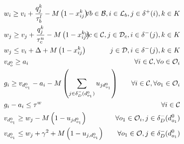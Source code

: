 \begin{alignat}{3}
    \label{mod:c5}         & w_{i} \geq v_{i}  + \frac{q^k_j}{\tau^l_b} -M\left(1- x^{k}_{ij}\right)                                                                                                                                                                                                                          & \hspace{-20mm} \forall  b \in \mathcal{B},  i \in \mathcal{L}_{b},  j \in \delta^{+}(i), k \in K \\
    \label{mod:c6}         & w_{j} \geq v_{j}  + {  \frac{q^k_j}{\tau^u_c} -M\left(1- x^{k}_{ij}\right) }                                                                                                                                                                                                                     & \hspace{-20mm}  \forall c \in  \mathcal{C}, j \in \mathcal{D}_{c}, i \in \delta^{-}(j),  k \in K \\
    \label{mod:c7}         & w_{j} \leq v_{i}  + \Delta + M\left(1- x^{k}_{ij}\right)                                                                                                                                                                                                                                         & \hspace{-20mm}   j \in \mathcal{D},  i \in \delta^{-}(j),  k \in K                               \\
    \label{mod:c8}         & v_{d^0_{o}} \geq a_i    & \hspace{-20mm} \forall  i \in \mathcal{C}, \forall o \in \mathcal{O}_i                           \\
    \label{mod:c9}  & g_{i} \geq v_{d^0_{o_1}} - a_i - M\left(  \sum_{ j \in \delta^{-}_{D}(d^0_{o_1})  }{u_{jd^0_{o_1}}}\right)  & \hspace{-20mm}  \forall  i \in \mathcal{C}, \forall o_1 \in \mathcal{O}_i   \\
    \label{mod:c91}  & g_{i} - a_i \leq \tau^w  & \hspace{-20mm}  \forall  i \in \mathcal{C}  \\
    \label{mod:c101}       & v_{d^0_{o_1}} \geq w_j - M\left(1- u_{jd^0_{o_1}}\right)   & \hspace{-40mm}    \forall o_1 \in \mathcal{O}_i,  j \in \delta_{D}^{-}(d^0_{o_1})                \\
    \label{mod:c10}        & v_{d^0_{o_1}}  \leq  w_j + \gamma^2 + M\left(1- u_{j,d^0_{o_1}}\right)                                                                                                                                                                                                                           & \hspace{-20mm}  \forall  o_1 \in \mathcal{O},  j \in \delta_{D}^{-}(d^0_{o_1})                   \\

\end{alignat}
